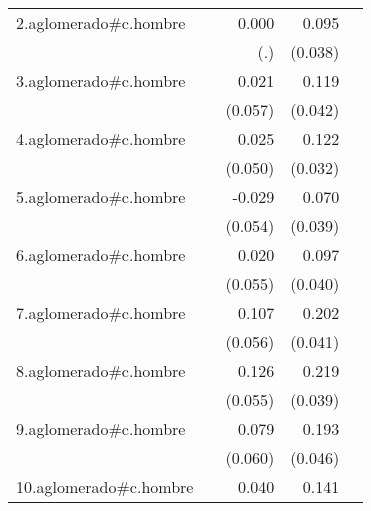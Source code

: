 {\begin{longtable}{l*{4}{D{.}{.}{-1}}}
\addlinespace
2.aglomerado#c.hombre&                     &       0.000         &       0.095\sym{*}  &                     \\
            &                     &         (.)         &     (0.038)         &                     \\
\addlinespace
3.aglomerado#c.hombre&                     &       0.021         &       0.119\sym{**} &                     \\
            &                     &     (0.057)         &     (0.042)         &                     \\
\addlinespace
4.aglomerado#c.hombre&                     &       0.025         &       0.122\sym{***}&                     \\
            &                     &     (0.050)         &     (0.032)         &                     \\
\addlinespace
5.aglomerado#c.hombre&                     &      -0.029         &       0.070         &                     \\
            &                     &     (0.054)         &     (0.039)         &                     \\
\addlinespace
6.aglomerado#c.hombre&                     &       0.020         &       0.097\sym{*}  &                     \\
            &                     &     (0.055)         &     (0.040)         &                     \\
\addlinespace
7.aglomerado#c.hombre&                     &       0.107         &       0.202\sym{***}&                     \\
            &                     &     (0.056)         &     (0.041)         &                     \\
\addlinespace
8.aglomerado#c.hombre&                     &       0.126\sym{*}  &       0.219\sym{***}&                     \\
            &                     &     (0.055)         &     (0.039)         &                     \\
\addlinespace
9.aglomerado#c.hombre&                     &       0.079         &       0.193\sym{***}&                     \\
            &                     &     (0.060)         &     (0.046)         &                     \\
\addlinespace
10.aglomerado#c.hombre&                     &       0.040         &       0.141\sym{***}&                     \\

\end{longtable}}
